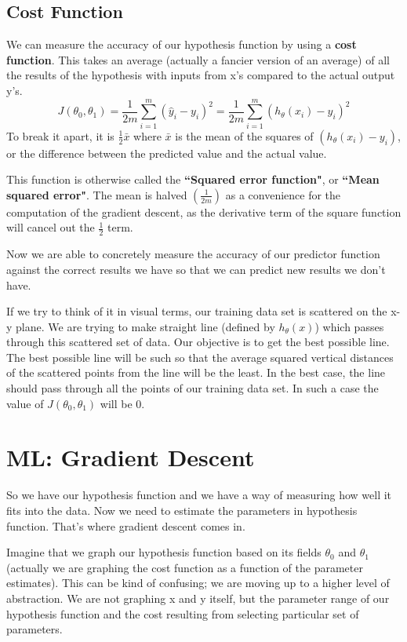 \subsection*{Cost Function}
We can measure the accuracy of our hypothesis function by using a {\bf cost function}. This takes an average (actually a fancier version of an average) of all the results of the hypothesis with inputs from x's compared to the actual output y's.
\begin{equation}
J(\theta_0, \theta_1) = \frac{1}{2m} \sum_{i=1}^m \left( \hat{y}_{i}- y_{i} \right)^2  = \frac{1}{2m} \sum_{i=1}^m \left( h_\theta (x_{i}) - y_{i} \right)^2
\end{equation}
To break it apart, it is $\frac{1}{2} \bar{x}$ where $\bar{x}$ is the mean of the squares of $(h_\theta (x_{i}) - y_{i})$, or the difference between the predicted value and the actual value.

This function is otherwise called the {\bf ``Squared error function"}, or {\bf ``Mean squared error"}. The mean is halved $\left(\frac{1}{2m}\right)$ as a convenience for the computation of the gradient descent, as the derivative term of the square function will cancel out the $\frac{1}{2}$ term.

Now we are able to concretely measure the accuracy of our predictor function against the correct results we have so that we can predict new results we don't have.

If we try to think of it in visual terms, our training data set is scattered on the x-y plane. We are trying to make straight line (defined by $h_\theta(x)$) which passes through this scattered set of data. Our objective is to get the best possible line. The best possible line will be such so that the average squared vertical distances of the scattered points from the line will be the least. In the best case, the line should pass through all the points of our training data set. In such a case the value of $J(\theta_0, \theta_1)$ will be 0.
\section*{ML: Gradient Descent}
So we have our hypothesis function and we have a way of measuring how well it fits into the data. Now we need to estimate the parameters in hypothesis function. That's where gradient descent comes in.

Imagine that we graph our hypothesis function based on its fields $\theta_0$ and $\theta_1$ (actually we are graphing the cost function as a function of the parameter estimates). This can be kind of confusing; we are moving up to a higher level of abstraction. We are not graphing x and y itself, but the parameter range of our hypothesis function and the cost resulting from selecting particular set of parameters.

